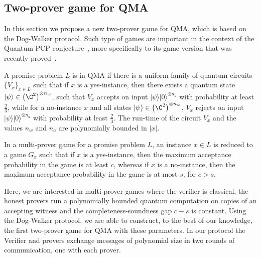 \documentclass{toc}
\newcommand{\ket}[1]{|#1\rangle}
\begin{document}
%


\subsection{Two-prover game for QMA}\label{sec:qma}

In this section we propose a new two-prover game for QMA, which is based on the Dog-Walker
protocol. Such type of games are important in the context of the Quantum PCP conjecture~\cite{AharonovAV13}, more specifically to its game version that was recently proved~\cite{NatarajanV18}.


A promise problem $L$ is in QMA if there is a uniform family
of quantum circuits $\{V_x\}_{x \in L}$ such that if $x$ is a yes-instance, then there exists a
quantum state $\ket{\psi} \in \left(\C^2\right)^{\otimes n_w}$, such that
$V_x$  accepts on input $\ket{\psi}\ket{0}^{\otimes n_a}$ with probability at least
$\frac{2}{3}$, while for a no-instance $x$ and  all states $\ket{\psi} \in
\left(\C^2\right)^{\otimes n_w}$, $V_x$
rejects on input $\ket{\psi}\ket{0}^{\otimes n_a}$ with probability at
least $\frac{2}{3}$. The run-time of the circuit $V_x$ and the values $n_w$ and $n_a$ are polynomially bounded in $|x|$.

 In a multi-prover game for a promise problem $L$, an
 instance $x \in L$ is reduced to a game $G_x$ such that if $x$ is a yes-instance, then the maximum
 acceptance probability in the game is at least $c$, whereas if $x$ is a
 no-instance,
 then the maximum acceptance probability in the game is  at most $s$, for $c
 > s$.

Here, we are interested in multi-prover games where the verifier is classical,
 the honest provers run a polynomially bounded quantum computation on copies
 of an accepting witness and the completeness-soundness gap $c-s$ is constant.
Using the Dog-Walker protocol, we are able to construct, to the best of our knowledge, the first two-prover
game for QMA with these parameters. In our protocol the Verifier and provers exchange messages of polynomial size 
in two rounds of communication, one with each prover.
\end{document}
